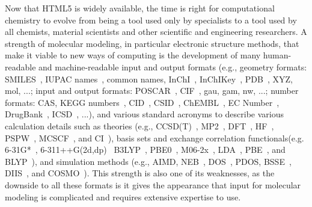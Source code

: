 \documentclass[runningheads,a4paper]{llncs}
\begin{document}
Now that HTML5 is widely available, the time is right for computational chemistry to evolve from being a tool used only by specialists to a tool used by all chemists, material scientists and other scientific and engineering researchers.  A strength of molecular modeling, in particular electronic structure methods, that make it viable to  new ways of computing is the development of many human-readable and machine-readable input and output formats (e.g., geometry formats: SMILES~\cite{weininger1988smiles,weininger1989smiles}, IUPAC names~\cite{favre2013nomenclature}, common names, InChI~\cite{heller2009iupac,heller2013inchi,heller2015inchi}, InChIKey~\cite{heller2009iupac,southan2013inchi}, PDB~\cite{westbrook2003pdb}, XYZ, mol, ...; input and output formats: POSCAR~\cite{ong2013python}, CIF~\cite{hall1991crystallographic}, gau, gam, nw, ...;  number formats: CAS, KEGG numbers~\cite{kanehisa2000kegg}, CID~\cite{kim2016pubchem}, CSID~\cite{williams2014royal,ayers2012chemspider}, ChEMBL~\cite{gaulton2017chembl}, EC Number~\cite{bairoch2000enzyme}, DrugBank~\cite{wishart2006drugbank}, ICSD~\cite{hellenbrandt2004inorganic}, ...), and various standard acronyms to describe various calculation details such as theories (e.g., CCSD(T)~\cite{bartlett1994applications,bartlett2007coupled}, MP2~\cite{moller1934note}, DFT~\cite{hohenberg1964inhomogeneous,kohn1965self}, HF~\cite{roothaan1960self}, PSPW~\cite{bylaska2017plane}, MCSCF~\cite{schmidt1998construction}, and CI~\cite{szabo2012modern,ross1952calculations}), basis sets and exchange correlation functionals(e.g. 6-31G*~\cite{francl1982a,gordon1982a,hariharan1973a,hehre1972a}, 6-311++G(2d,dp)~\cite{clark1983a,francl1982a,krishnan1980a,mclean1980a,spitznagel1987a} B3LYP~\cite{beck1993density,lee1988development}, PBE0~\cite{adamo1999toward}, M06-2x~\cite{zhao2008m06}, LDA~\cite{vosko1980accurate}, PBE~\cite{perdew1996generalized}, and BLYP~\cite{becke1988density,lee1988development}), and simulation methods (e.g., AIMD, NEB~\cite{jonsson1998nudged}, DOS~\cite{ashcroft1976solid}, PDOS, BSSE~\cite{van1994state}, DIIS~\cite{pulay1980convergence}, and COSMO~\cite{klamt1993cosmo}).  This strength is also one of its weaknesses, as the downside to all these formats is it gives the appearance that input for molecular modeling is complicated and requires extensive expertise to use.
\end{document}

